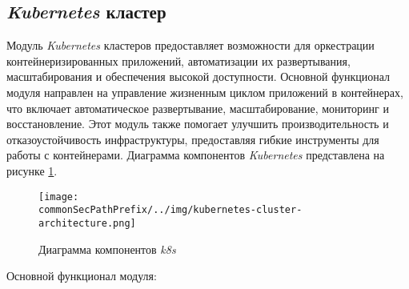 \subsection{\textit{Kubernetes} кластер}
\label{sec:kubernetes_cluster_functionality}

Модуль \textit{Kubernetes} кластеров предоставляет возможности для оркестрации контейнеризированных приложений, автоматизации их развертывания, масштабирования и обеспечения высокой доступности. Основной функционал модуля направлен на управление жизненным циклом приложений в контейнерах, что включает автоматическое развертывание, масштабирование, мониторинг и восстановление. Этот модуль также помогает улучшить производительность и отказоустойчивость инфраструктуры, предоставляя гибкие инструменты для работы с контейнерами. Диаграмма компонентов \textit{Kubernetes} представлена на рисунке \ref{fig:kubernetes_cluster_functionality:k8s_components}.
\begin{figure}[ht]
    \centering
    \texttt{[image: \\commonSecPathPrefix/../img/kubernetes-cluster-architecture.png]}
    \caption{Диаграмма компонентов \textit{k8s}}
    \label{fig:kubernetes_cluster_functionality:k8s_components}
\end{figure}

Основной функционал модуля:

